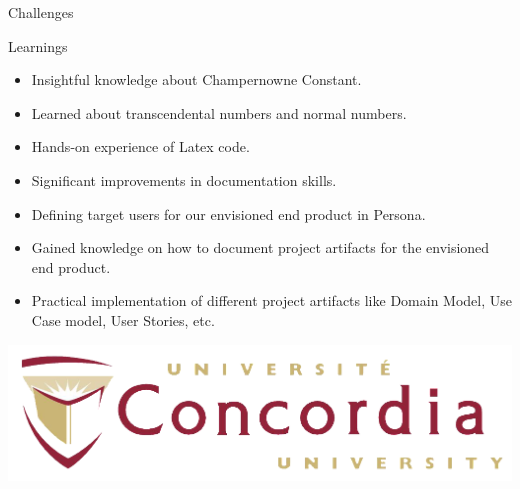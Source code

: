 \documentclass[final]{beamer}
\newlength{\onecolwid}
\begin{document}
\begin{frame}[t]
\begin{columns}[t]
\begin{column}{\onecolwid}
\begin{block}{Challenges}
\end{block}


\begin{block}{Learnings}

\begin{itemize}
\item Insightful knowledge about Champernowne Constant.
\item Learned about transcendental numbers and normal numbers.
\item Hands-on experience of Latex code.
\item Significant improvements in documentation skills.
\item Defining target users for our envisioned end product in Persona.
\item Gained knowledge on how to document project artifacts for the envisioned end product.
\item Practical implementation of different project artifacts like Domain Model, Use Case model, User Stories, etc.
\end{itemize}

\end{block}



\vspace{5cm}
\begin{center}
\includegraphics[width=0.8\linewidth]{Concordia-University-logo.png}
\end{center}

\end{column} %

\end{columns} %

\end{frame} %
\end{document}

